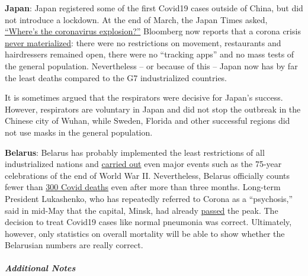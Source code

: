 \textbf{Japan}: Japan registered some of the first Covid19 cases outside
of China, but did not introduce a lockdown. At the end of March, the
Japan Times asked,
\href{https://www.japantimes.co.jp/news/2020/03/20/national/coronavirus-explosion-expected-japan/}{``Where's
the coronavirus explosion?''} Bloomberg now reports that a corona crisis
\href{https://www.bloomberg.com/news/articles/2020-05-22/did-japan-just-beat-the-virus-without-lockdowns-or-mass-testing}{never
materialized}: there were no restrictions on movement, restaurants and
hairdressers remained open, there were no ``tracking apps'' and no mass
tests of the general population. Nevertheless -- or because of this --
Japan now has by far the least deaths compared to the G7 industrialized
countries.

It is sometimes argued that the respirators were decisive for Japan's
success. However, respirators are voluntary in Japan and did not stop
the outbreak in the Chinese city of Wuhan, while Sweden, Florida and
other successful regions did not use masks in the general population.

\textbf{Belarus}: Belarus has probably implemented the least
restrictions of all industrialized nations and
\href{https://www.youtube.com/watch?v=NZliKGoUN4E}{carried out} even
major events such as the 75-year celebrations of the end of World War
II. Nevertheless, Belarus officially counts fewer than
\href{https://en.wikipedia.org/wiki/COVID-19_pandemic_in_Belarus}{300
Covid deaths} even after more than three months. Long-term President
Lukashenko, who has repeatedly referred to Corona as a ``psychosis,''
said in mid-May that the capital, Minsk, had already
\href{https://eng.belta.by/president/view/belarus-president-coronavirus-situation-on-the-mend-130571-2020/}{passed}
the peak. The decision to treat Covid19 cases like normal pneumonia was
correct. Ultimately, however, only statistics on overall mortality will
be able to show whether the Belarusian numbers are really correct.

\hypertarget{additional-notes}{%
\subparagraph{\texorpdfstring{\textbf{Additional
Notes}}{Additional Notes}}\label{additional-notes}}

